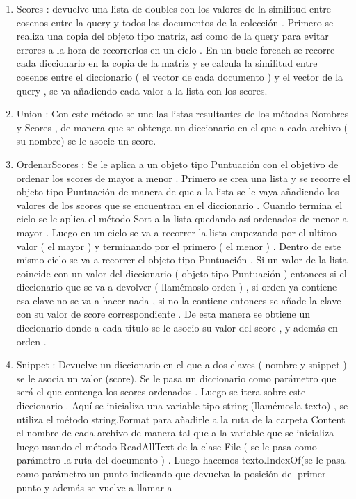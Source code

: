 \documentclass[10pt]{extarticle}
\begin{document}
\begin{enumerate}
 	\item  Scores : devuelve una lista de doubles con los valores de la similitud entre cosenos entre 
	la query y todos los documentos de la colección . Primero se realiza una copia del objeto tipo 
	matriz, así como de la query para evitar errores a la hora de recorrerlos en un ciclo . En un bucle 
	foreach se recorre cada diccionario en la copia de la matriz y se calcula la similitud entre cosenos 
	entre el diccionario ( el vector de cada documento ) y el vector de la query , se va añadiendo cada 
	valor a la lista con los scores. 
    \item Union : Con este método se une las listas resultantes de los métodos Nombres y Scores , de manera 
	que se obtenga un diccionario en el que a cada archivo ( su nombre) se le asocie un score. 
	\item  OrdenarScores : Se le aplica a un objeto tipo Puntuación con el objetivo de ordenar los 
	scores de mayor a menor . Primero se crea una lista y se recorre el objeto tipo Puntuación de 
	manera de que a la lista se le vaya añadiendo los valores de los scores que se encuentran en el 
	diccionario . Cuando termina el ciclo se le aplica el método Sort a la lista quedando así ordenados 
	de menor a mayor . Luego en un ciclo se va a recorrer la lista empezando por el ultimo valor ( el 
	mayor ) y terminando por el primero ( el menor ) . Dentro de este mismo ciclo se va a recorrer el 
	objeto tipo Puntuación . Si un valor de la lista coincide con un valor del diccionario ( objeto tipo
	Puntuación ) entonces si el diccionario que se va a devolver ( llamémoslo orden ) , si orden ya 
	contiene esa clave no se va a hacer nada , si no la contiene entonces se añade la clave con su valor 
	de score correspondiente . De esta manera se obtiene un diccionario donde a cada titulo se le 
	asocio su valor del score , y además en orden . 
	\item  Snippet : Devuelve un diccionario en el que a dos claves ( nombre y snippet ) se le 
	asocia un valor (score). 
	Se le pasa un diccionario como parámetro que será el que contenga los scores ordenados . Luego 
	se itera sobre este diccionario . Aquí se inicializa una variable tipo string (llamémosla texto) , se 
	utiliza el método string.Format para añadirle a la ruta de la carpeta Content el nombre de cada 
	archivo de manera tal que a la variable que se inicializa luego 
	usando el método ReadAllText de la clase File ( se le pasa como parámetro la ruta del documento ) .
    Luego hacemos texto.IndexOf(se le pasa como parámetro un 
	punto indicando que devuelva la posición del primer punto y además se vuelve a llamar a 

\end{enumerate}
\end{document}

